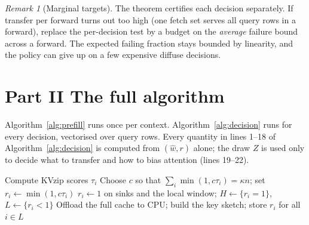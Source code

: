 \documentclass[11pt]{article}
\theoremstyle{definition}
\theoremstyle{remark}
\newtheorem{remark}{Remark}
\begin{document}
\begin{remark}[Marginal targets]
The theorem certifies each decision separately. If transfer per forward turns out too high (one fetch set serves all query
rows in a forward), replace the per-decision test by a budget on the \emph{average} failure bound across a forward. The
expected failing fraction stays bounded by linearity, and the policy can give up on a few expensive diffuse decisions.
\end{remark}

\part*{Part II \quad The full algorithm}

Algorithm~\ref{alg:prefill} runs once per context. Algorithm~\ref{alg:decision} runs for every decision, vectorised over
query rows. Every quantity in lines 1--18 of Algorithm~\ref{alg:decision} is computed from $(\hat w, r)$ alone; the draw $Z$
is used only to decide what to transfer and how to bias attention (lines 19--22).

\begin{algorithm}[H]
\caption{Vkv prefill (once per context)}\label{alg:prefill}
Compute KVzip scores $\tau_i$\;
Choose $c$ so that $\sum_i \min(1, c\tau_i) = \kappa n$; set $r_i \gets \min(1, c\tau_i)$\;
$r_i \gets 1$ on sinks and the local window; $H \gets \{r_i = 1\}$, $L \gets \{r_i < 1\}$\;
Offload the full cache to CPU; build the key sketch; store $r_i$ for all $i \in L$\;
\end{algorithm}
\end{document}

